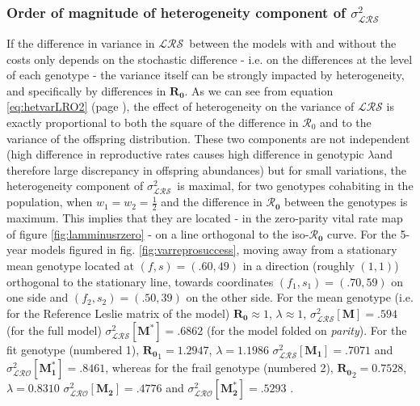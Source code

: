 \documentclass[10pt,a4paper]{article}
\newcommand{\lam}{$\lambda$}
\newcommand{\Rzero}{$\boldsymbol{\mathcal{R}_{0}}$  }
\newcommand{\LRO}{$\mathcal{LRS}$}
\newcommand{\PCoR}{\emph{individual} costs}
\newcommand{\vLRO}{$\sigma_{\mathrm{\mathcal{LRS}}}^2$}
\begin{document}
{\subsubsection*{Order of magnitude of heterogeneity component of \vLRO}
If the difference in variance in \LRO\ between the models with and without the costs only depends on the stochastic difference - i.e. on the differences at the level of each genotype - the variance itself can be strongly impacted by heterogeneity, and specifically by differences in $\mathbf{R_0}$. As we can see from equation \ref{eq:hetvarLRO2} (page \pageref{eq:hetvarLRO2}),
the effect of heterogeneity on the variance of $\mathcal{LRS}$ is exactly proportional to both the square of the difference in $\mathcal{R_0}$ and to the variance of the offspring distribution. These two components are not independent (high difference in reproductive rates causes high difference in genotypic \lam and therefore large discrepancy in offspring abundances) but for small variations, the heterogeneity component of \vLRO\ is maximal, for two genotypes cohabiting in the population, when $w_{1}=w_{2}=\frac{1}{2}$ and the difference in \Rzero between the genotypes is maximum. This implies that they are located - in the zero-parity vital rate map of figure \ref{fig:lamminusrzero} - on a line orthogonal to the iso-\Rzero curve. For the 5-year models figured in fig. \ref{fig:varreprosuccess}, moving away from a stationary mean genotype located at $(f,s)=(.60,49)$ in a direction (roughly $(1,1)$) orthogonal to the stationary line, towards coordinates $(f_{1},s_{1})=(.70,59)$ on one side and $(f_{2},s_{2})=(.50,39)$ on the other side. For the mean genotype (i.e. for the Reference Leslie matrix of the model) $\mathbf{R_0} \approx 1$, $\lambda \approx 1$,  $\sigma^{2}_{\mathcal{LRS}}\left[ \mathbf{M}\right]=.594$ (for the full model)  $\sigma^{2}_{\mathcal{LRS}}\left[ \mathbf{M^{*}}\right]= .6862$ (for the model folded on \emph{parity}). For the fit genotype (numbered 1), $\mathbf{R_0}_{1} = 1.2947$, $\lambda = 1.1986$  $\sigma^{2}_{\mathcal{LRS}}\left[ \mathbf{M_{1}}\right] =.7071 $ and $\sigma^{2}_{\mathcal{LRO}}\left[ \mathbf{M_{1}^{*}}\right]= .8461$, whereas for the frail genotype (numbered 2), $\mathbf{R_0}_{2}= 0.7528$, $\lambda = 0.8310$  $\sigma^{2}_{\mathcal{LRO}}\left[ \mathbf{M_{2}}\right]=.4776 $ and $\sigma^{2}_{\mathcal{LRO}}\left[ \mathbf{M_{2}^{*}}\right]= .5293$ .
}
\end{document}
